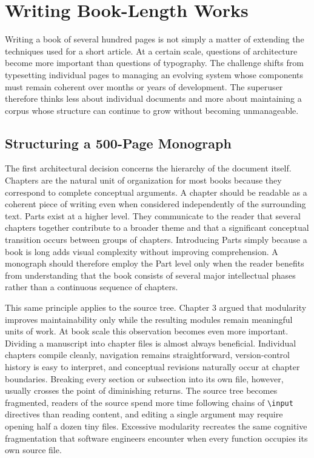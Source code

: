 \hypertarget{chapter-20-writing-book-length-works}{%
\chapter{Writing Book-Length Works}\label{chapter-20-writing-book-length-works}}

Writing a book of several hundred pages is not simply a matter of extending the techniques used for a short article. At a certain scale, questions of architecture become more important than questions of typography. The challenge shifts from typesetting individual pages to managing an evolving system whose components must remain coherent over months or years of development. The superuser therefore thinks less about individual documents and more about maintaining a corpus whose structure can continue to grow without becoming unmanageable.

\hypertarget{structuring-a-500-page-monograph}{%
\section{Structuring a 500-Page Monograph}\label{structuring-a-500-page-monograph}}

The first architectural decision concerns the hierarchy of the document itself. Chapters are the natural unit of organization for most books because they correspond to complete conceptual arguments. A chapter should be readable as a coherent piece of writing even when considered independently of the surrounding text. Parts exist at a higher level. They communicate to the reader that several chapters together contribute to a broader theme and that a significant conceptual transition occurs between groups of chapters. Introducing Parts simply because a book is long adds visual complexity without improving comprehension. A monograph should therefore employ the Part level only when the reader benefits from understanding that the book consists of several major intellectual phases rather than a continuous sequence of chapters.

This same principle applies to the source tree. Chapter 3 argued that modularity improves maintainability only while the resulting modules remain meaningful units of work. At book scale this observation becomes even more important. Dividing a manuscript into chapter files is almost always beneficial. Individual chapters compile cleanly, navigation remains straightforward, version-control history is easy to interpret, and conceptual revisions naturally occur at chapter boundaries. Breaking every section or subsection into its own file, however, usually crosses the point of diminishing returns. The source tree becomes fragmented, readers of the source spend more time following chains of \texttt{\textbackslash{}input} directives than reading content, and editing a single argument may require opening half a dozen tiny files. Excessive modularity recreates the same cognitive fragmentation that software engineers encounter when every function occupies its own source file.

